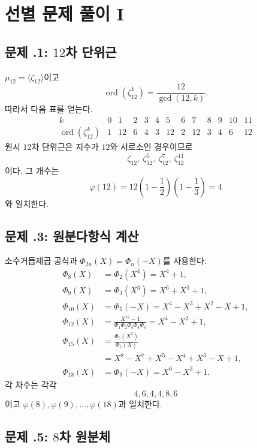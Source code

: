 \clearpage
\section{선별 문제 풀이 I}
\label{sec:cyclotomic-cyclic-solutions-a}

\subsection*{문제 \thechapter.1: $12$차 단위근}

\begin{solution}
$\mu_{12}=\langle\zeta_{12}\rangle$이고
\[
  \operatorname{ord}(\zeta_{12}^k)
  =\frac{12}{\gcd(12,k)}.
\]
따라서 다음 표를 얻는다.
\[
\begin{array}{c|cccccccccccc}
k&0&1&2&3&4&5&6&7&8&9&10&11\\
\hline
\operatorname{ord}(\zeta_{12}^k)
&1&12&6&4&3&12&2&12&3&4&6&12
\end{array}
\]
원시 $12$차 단위근은 지수가 $12$와 서로소인 경우이므로
\[
  \boxed{
  \zeta_{12},\ \zeta_{12}^5,
  \ \zeta_{12}^7,\ \zeta_{12}^{11}}
\]
이다. 그 개수는
\[
  \varphi(12)=12\left(1-\frac12\right)
  \left(1-\frac13\right)=4
\]
와 일치한다.
\end{solution}

\subsection*{문제 \thechapter.3: 원분다항식 계산}

\begin{solution}
소수거듭제곱 공식과 $\Phi_{2n}(X)=\Phi_n(-X)$를 사용한다.
\[
\begin{aligned}
  \Phi_8(X)
  &=\Phi_2(X^4)=X^4+1,\\
  \Phi_9(X)
  &=\Phi_3(X^3)=X^6+X^3+1,\\
  \Phi_{10}(X)
  &=\Phi_5(-X)
    =X^4-X^3+X^2-X+1,\\
  \Phi_{12}(X)
  &=\frac{X^{12}-1}
    {\Phi_1\Phi_2\Phi_3\Phi_4\Phi_6}
    =X^4-X^2+1,\\
  \Phi_{15}(X)
  &=\frac{\Phi_5(X^3)}{\Phi_5(X)}\\
  &=X^8-X^7+X^5-X^4+X^3-X+1,\\
  \Phi_{18}(X)
  &=\Phi_9(-X)=X^6-X^3+1.
\end{aligned}
\]
각 차수는 각각
\[
  4,6,4,4,8,6
\]
이고 $\varphi(8),\varphi(9),\dots,\varphi(18)$과 일치한다.
\end{solution}

\subsection*{문제 \thechapter.5: $8$차 원분체}

